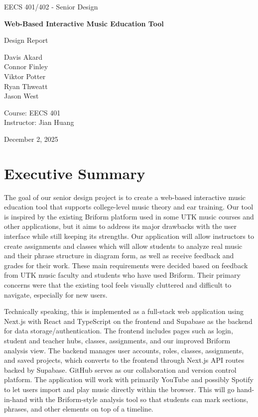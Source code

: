 \documentclass[12pt, letterpaper]{article}
\begin{document}
\begin{titlepage}
    \centering
    {\Large EECS 401/402 - Senior Design \par}
    \vspace{1cm}
    {\huge\bfseries Web-Based Interactive Music Education Tool\par}
    \vspace{1cm}
    {\Large Design Report\par}
    \vfill
    {\large
    Davis Akard \\
    Connor Finley \\
    Viktor Potter \\
    Ryan Thweatt \\
    Jason West\par}
    \vspace{1cm}
    {\large
    Course: EECS 401 \\
    Instructor: Jian Huang\par}
    \vfill
    {\large December 2, 2025 \par}
\end{titlepage}

\section*{Executive Summary}
The goal of our senior design project is to create a web-based interactive music education tool that supports college-level music theory and ear training. Our tool is inspired by the existing Briform platform used in some UTK music courses and other applications, but it aims to address its major drawbacks with the user interface while still keeping its strengths. Our application will allow instructors to create assignments and classes which will allow students to analyze real music and their phrase structure in diagram form, as well as receive feedback and grades for their work. These main requirements were decided based on feedback from UTK music faculty and students who have used Briform. Their primary concerns were that the existing tool feels visually cluttered and difficult to navigate, especially for new users.

Technically speaking, this is implemented as a full-stack web application using Next.js with React and TypeScript on the frontend and Supabase as the backend for data storage/authentication. The frontend includes pages such as login, student and teacher hubs, classes, assignments, and our improved Briform analysis view. The backend manages user accounts, roles, classes, assignments, and saved projects, which converts to the frontend through Next.js API routes backed by Supabase. GitHub serves as our collaboration and version control platform. The application will work with primarily YouTube and possibly Spotify to let users import and play music directly within the browser. This will go hand-in-hand with the Briform-style analysis tool so that students can mark sections, phrases, and other elements on top of a timeline.
\end{document}
